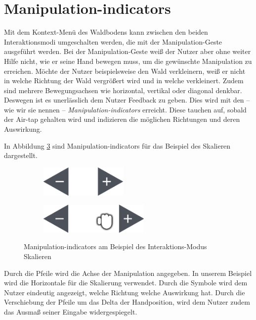 \section{Manipulation-indicators}
\label{subsec:manipulation-indicators}
Mit dem Kontext-Menü des Waldbodens kann zwischen den beiden Interaktionsmodi umgeschalten werden, die mit der Manipulation-Geste ausgeführt werden. Bei der Manipulation-Geste weiß der Nutzer aber ohne weiter Hilfe nicht, wie er seine Hand bewegen muss, um die gewünschte Manipulation zu erreichen. Möchte der Nutzer beispielsweise den Wald verkleinern, weiß er nicht in welche Richtung der Wald vergrößert wird und in welche verkleinert. Zudem sind mehrere Bewegungsachsen wie horizontal, vertikal oder diagonal denkbar. Deswegen ist es unerlässlich dem Nutzer Feedback zu geben. Dies wird mit den -- wie wir sie nennen -- \textit{Manipulation-indicators} erreicht. Diese tauchen auf, sobald der Air-tap gehalten wird und indizieren die möglichen Richtungen und deren Auswirkung.

In Abbildung \ref{fig:manipulation} sind Manipulation-indicators für das Beispiel des Skalieren dargestellt.

\begin{figure}[htb]
  \centering
  \begin{subfigure}[t]{\fwidth}
    \centering
    \includegraphics[height=1.5cm]{figures/manipulation}
     \label{fig:manipulation}
  \end{subfigure}
  \begin{subfigure}[t]{\fwidth}
    \centering
  	\includegraphics[height=1.5cm]{figures/manipulation-drag}
  	 \label{fig:manipulation-drag}
  \end{subfigure}
  \caption{Manipulation-indicators am Beispiel des Interaktions-Modus Skalieren} \label{fig:manipulation}
\end{figure}

Durch die Pfeile wird die Achse der Manipulation angegeben. In unserem Beispiel wird die Horizontale für die Skalierung verwendet. Durch die Symbole wird dem Nutzer eindeutig angezeigt, welche Richtung welche Auswirkung hat. Durch die Verschiebung der Pfeile um das Delta der Handposition, wird dem Nutzer zudem das Ausmaß seiner Eingabe widergespiegelt.

